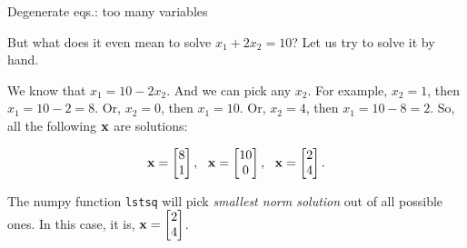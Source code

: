 \documentclass{beamer}
\begin{document}
\begin{frame}{Degenerate eqs.: too many variables}
	\begin{flushleft}
		
		But what does it even mean to solve $x_1   + 2 x_2 = 10$? Let us try to solve it by hand.
		
		\bigskip
		
		We know that $x_1  =10 -  2 x_2$. And we can pick any $x_2$. For example, $x_2 = 1$, then $x_1  =10 -  2 = 8$. Or, $x_2 = 0$, then $x_1  =10$. Or, $x_2 = 4$, then $x_1  =10 - 8 = 2$. So, all the following $\mathbf{x}$ are solutions:
		
		\begin{equation}
	\bo{x} =
	\begin{bmatrix}
		8 \\
		1
	\end{bmatrix},
	\ \ 
	\bo{x} =
	\begin{bmatrix}
		10 \\
		0
	\end{bmatrix},
\ \ 
	\bo{x} =
	\begin{bmatrix}
	2 \\
	4
	\end{bmatrix}.
\end{equation}		
		
The numpy function \texttt{lstsq} will pick \emph{smallest norm solution} out of all possible ones. In this case, it is, $\mathbf{x} =
\begin{bmatrix}
	2 \\
	4
\end{bmatrix}$.
		
	\end{flushleft}
\end{frame}
\end{document}

